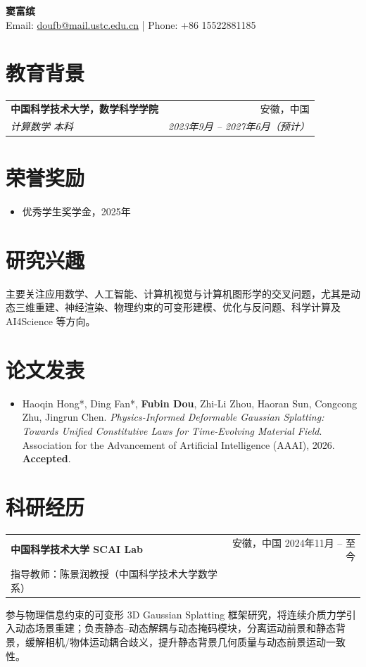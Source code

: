 \documentclass[10.5pt,a4paper]{article}
\makeatletter
\newcommand{\resumeSubheading}[4]{%
  \begin{tabularx}{\textwidth}{@{}X r@{}}
    \textbf{#1} & #2 \\
    \textit{#3} & \textit{#4} \\
  \end{tabularx}\vspace{-0.15em}
}
\newcommand{\resumeExperience}[4]{%
  \begin{tabularx}{\textwidth}{@{}X r@{}}
    \textbf{#1} & #2 \\
    {\small #3} & {\small #4} \\
  \end{tabularx}\vspace{0.10em}
}
\newcommand{\resumeParagraph}[1]{%
  {\setlength{\parskip}{0pt}\linespread{1.08}\selectfont #1\par}\vspace{0.10em}
}
\makeatother
\begin{document}
\begin{center}
    {\LARGE \textbf{窦富缤}} \\
    \vspace{0.25em}
    Email: \href{mailto:doufb@mail.ustc.edu.cn}{doufb@mail.ustc.edu.cn}
    \quad | \quad
    Phone: +86 15522881185

\end{center}
\vspace{-0.6em}

\section{教育背景}
\resumeSubheading
{中国科学技术大学，数学科学学院}{安徽，中国}
{计算数学 本科}{2023年9月 -- 2027年6月（预计）}

\section{荣誉奖励}
\begin{itemize}
    \item 优秀学生奖学金，2025年
\end{itemize}

\section{研究兴趣}
\resumeParagraph{主要关注应用数学、人工智能、计算机视觉与计算机图形学的交叉问题，尤其是动态三维重建、神经渲染、物理约束的可变形建模、优化与反问题、科学计算及 AI4Science 等方向。}

\section{论文发表}
\begin{itemize}
    \item Haoqin Hong*, Ding Fan*, \textbf{Fubin Dou}, Zhi-Li Zhou, Haoran Sun, Congcong Zhu, Jingrun Chen. 
    \textit{Physics-Informed Deformable Gaussian Splatting: Towards Unified Constitutive Laws for Time-Evolving Material Field}. 
    Association for the Advancement of Artificial Intelligence (AAAI), 2026. \textbf{Accepted}.
\end{itemize}

\section{科研经历}
\resumeExperience
{中国科学技术大学 SCAI Lab}{安徽，中国 \quad 2024年11月 -- 至今}
{指导教师：陈景润教授（中国科学技术大学数学系）}{}
\resumeParagraph{参与物理信息约束的可变形 3D Gaussian Splatting 框架研究，将连续介质力学引入动态场景重建；负责静态--动态解耦与动态掩码模块，分离运动前景和静态背景，缓解相机/物体运动耦合歧义，提升静态背景几何质量与动态前景运动一致性。}
\end{document}
